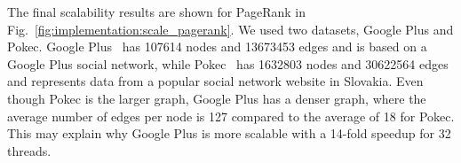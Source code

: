 \begin{figure}[]

        \label{fig:implementation:scale_sssp}
\end{figure}

The final scalability results are shown for PageRank in
Fig.~\ref{fig:implementation:scale_pagerank}. We used two datasets, Google Plus
and Pokec. Google Plus~\cite{snapnets} has 107614 nodes and 13673453 edges and is based on a Google Plus social network, while Pokec~\cite{snapnets} has
1632803 nodes and 30622564 edges and represents data from a popular social network website in Slovakia.
Even though Pokec is the larger graph, Google
Plus has a denser graph, where the average number of edges per node is 127
compared to the average of 18 for Pokec. This may explain why Google Plus is
more scalable with a 14-fold speedup for 32 threads.

